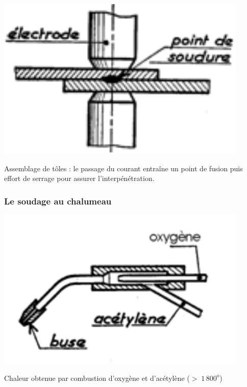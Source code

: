 \documentclass[11pt,oneside]{article}
\begin{document}
\begin{minipage}[c]{.3\linewidth}
\begin{center}
\includegraphics[width=0.9\textwidth]{png/points}
\end{center}
\end{minipage}\hfill
\begin{minipage}[c]{.65\linewidth}

Assemblage de tôles : le passage du courant entraîne un point de fusion puis effort de serrage pour assurer l'interpénétration.

\end{minipage}

\subsubsection{Le soudage au chalumeau}

\begin{minipage}[c]{.3\linewidth}
\begin{center}
\includegraphics[width=0.9\textwidth]{png/chalumeau}
\end{center}
\end{minipage}\hfill
\begin{minipage}[c]{.65\linewidth}

Chaleur obtenue par combustion d'oxygène et d'acétylène ($>\; 1\,800^{\text{o}}$)

\end{minipage}
\end{document}
